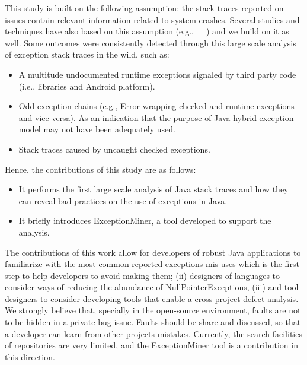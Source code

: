 \documentclass[conference]{IEEEtran}
\begin{document}
This study is built on the following assumption: the stack traces reported on
issues contain relevant information related to system crashes. Several studies
and techniques have also based on this assumption
(e.g.,~\cite{sinha2009fault}~\cite{dhaliwal2011classifying}~\cite{kim2013predicting})
and we build on it as well. Some outcomes were consistently detected through
this large scale analysis of exception stack traces in the wild, such as:

\begin{itemize}

  \item  A multitude undocumented runtime exceptions signaled by third party
    code (i.e., libraries and Android platform).

  \item  Odd exception chains (e.g., Error wrapping checked and runtime
    exceptions and vice-versa). As an indication that the purpose of Java hybrid
    exception model may not have been adequately used.

  \item  Stack traces caused by uncaught checked exceptions.

\end{itemize}

Hence, the contributions of this study are as follows:
\begin{itemize}

  \item  It performs the first large scale analysis of Java stack traces and how
    they can reveal bad-practices on the use of exceptions in Java.

  \item  It briefly introduces ExceptionMiner, a tool developed to support the
    analysis.

\end{itemize}


The contributions of this work allow for developers of robust Java applications
to familiarize with the most common reported exceptions mis-uses which is the
first step to help developers to avoid making them; (ii) designers of languages
to consider ways of reducing the abundance of NullPointerExceptions, (iii) and
tool designers to consider developing tools that enable a cross-project defect
analysis. We strongly believe that, specially in the open-source environment,
faults are not to be hidden in a private bug issue. Faults should be share and
discussed, so that a developer can learn from other projects mistakes.
Currently, the search facilities of repositories are very limited, and the
ExceptionMiner tool is a contribution in this direction.
\end{document}

